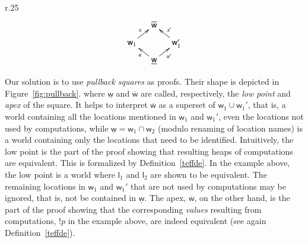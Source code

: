 \documentclass[orivec]{llncs}
\newcommand{\cloc}{\ensuremath{\mathsf{l}}\xspace}
\newcommand\w{\ensuremath{\mathsf{w}}\xspace}
\begin{document}
\begin{wrapfigure}{r}{.25\textwidth}
 \vspace{-12mm}
\begin{displaymath}
\vcenter{\xymatrix@C=1pc@R=0.5pc{ 
& \overline{\w}\\
\w_1\ar[ru]^x & & \w_1'\ar[lu]_{x'}\\
& \underline{\w}\ar[ru]_{u'} \ar[lu]^u
}}
\end{displaymath}
\caption{Pullback square.}
\label{fig:pullback}
\vspace{-9mm}
\end{wrapfigure}
Our solution is to use \emph{pullback squares} as proofs. Their shape is
depicted in Figure~\ref{fig:pullback}.
where $\underline{\w}$ and $\overline{\w}$ are called, respectively, the
\emph{low point} and \emph{apex} of the square.  It helps to interpret
$\overline{\w} $ as a superset of $\w_1 \cup \w_1'$, that is, a world
containing all the locations mentioned in $\w_1$ and $\w_1'$, even the
locations not used by computations, while $\underline{\w} = \w_1
\cap \w_2$ (modulo renaming of location names) is a world containing only
the locations that need to be identified. Intuitively, the low point
is the part of the proof showing that resulting heaps of computations are
equivalent. This is formalized by Definition~\ref{teffde}. In the
example above,
the low point is a world where $\cloc_1$ and $\cloc_2$ are
shown to be equivalent. The remaining locations in $\w_1$ and $\w_1'$ that
are not used by computations may be ignored, that is, not be contained in
$\underline{\w}$. 
The apex, $\overline{\w}$, on the other hand, is the part of the proof 
showing that the corresponding \emph{values} resulting from computations,
$!p$ in the example above, are indeed equivalent (see again
Definition~\ref{teffde}). 
\end{document}
